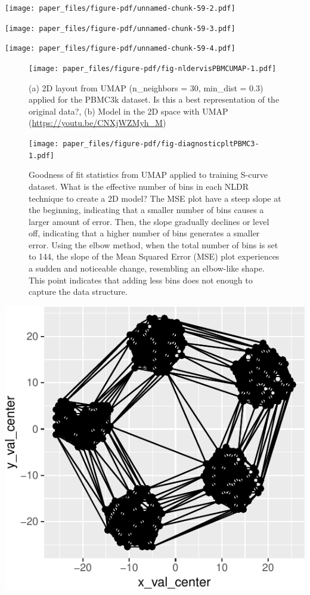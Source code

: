 \documentclass[
  12pt]{article}
\begin{document}
\texttt{[image: paper\_files/figure-pdf/unnamed-chunk-59-2.pdf]}

\texttt{[image: paper\_files/figure-pdf/unnamed-chunk-59-3.pdf]}

\texttt{[image: paper\_files/figure-pdf/unnamed-chunk-59-4.pdf]}

\begin{figure}[h]

{\centering \texttt{[image: paper\_files/figure-pdf/fig-nldervisPBMCUMAP-1.pdf]}

}

\caption{\label{fig-nldervisPBMCUMAP}(a) 2D layout from UMAP
(n\_neighbors = 30, min\_dist = 0.3) applied for the PBMC3k dataset. Is
this a best representation of the original data?, (b) Model in the 2D
space with UMAP (\url{https://youtu.be/CNXjWZMyh_M})}

\end{figure}

\begin{figure}

{\centering \texttt{[image: paper\_files/figure-pdf/fig-diagnosticpltPBMC3-1.pdf]}

}

\caption{\label{fig-diagnosticpltPBMC3}Goodness of fit statistics from
UMAP applied to training S-curve dataset. What is the effective number
of bins in each NLDR technique to create a 2D model? The MSE plot have a
steep slope at the beginning, indicating that a smaller number of bins
causes a larger amount of error. Then, the slope gradually declines or
level off, indicating that a higher number of bins generates a smaller
error. Using the elbow method, when the total number of bins is set to
144, the slope of the Mean Squared Error (MSE) plot experiences a sudden
and noticeable change, resembling an elbow-like shape. This point
indicates that adding less bins does not enough to capture the data
structure.}

\end{figure}

\includegraphics{paper_files/figure-pdf/unnamed-chunk-65-1.pdf}
\end{document}
